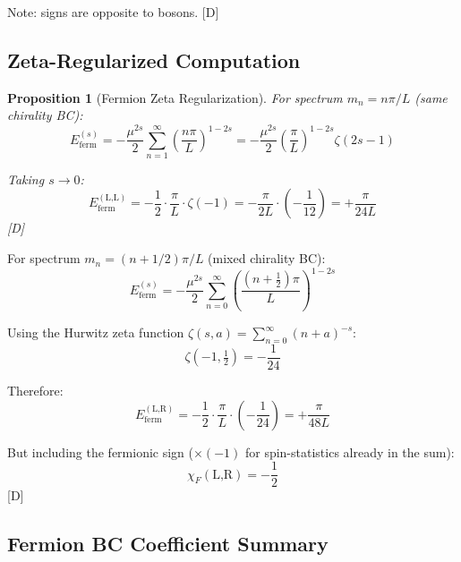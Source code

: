 \documentclass[11pt,a4paper]{article}
\newtheorem{proposition}[theorem]{Proposition}
\newcommand{\tagD}{\textcolor{blue!70!black}{[D]}}
\begin{document}
Note: signs are opposite to bosons. \tagD

\subsection{Zeta-Regularized Computation}

\begin{proposition}[Fermion Zeta Regularization]
\label{prop:ferm-zeta}
For spectrum $m_n = n\pi/L$ (same chirality BC):
\begin{equation}
\label{eq:ferm-zeta-def}
E_{\text{ferm}}^{(s)} = -\frac{\mu^{2s}}{2} \sum_{n=1}^\infty \left(\frac{n\pi}{L}\right)^{1-2s}
= -\frac{\mu^{2s}}{2} \left(\frac{\pi}{L}\right)^{1-2s} \zeta(2s-1)
\end{equation}

Taking $s \to 0$:
\begin{equation}
\label{eq:ferm-zeta-limit}
E_{\text{ferm}}^{(\text{L,L})} = -\frac{1}{2} \cdot \frac{\pi}{L} \cdot \zeta(-1) = -\frac{\pi}{2L} \cdot \left(-\frac{1}{12}\right) = +\frac{\pi}{24L}
\end{equation}
\tagD
\end{proposition}

For spectrum $m_n = (n+1/2)\pi/L$ (mixed chirality BC):
\begin{equation}
\label{eq:ferm-zeta-mixed}
E_{\text{ferm}}^{(s)} = -\frac{\mu^{2s}}{2} \sum_{n=0}^\infty \left(\frac{(n+\frac{1}{2})\pi}{L}\right)^{1-2s}
\end{equation}

Using the Hurwitz zeta function $\zeta(s, a) = \sum_{n=0}^\infty (n+a)^{-s}$:
\begin{equation}
\label{eq:hurwitz-val}
\zeta(-1, \tfrac{1}{2}) = -\frac{1}{24}
\end{equation}

Therefore:
\begin{equation}
\label{eq:ferm-zeta-LR}
E_{\text{ferm}}^{(\text{L,R})} = -\frac{1}{2} \cdot \frac{\pi}{L} \cdot \left(-\frac{1}{24}\right) = +\frac{\pi}{48L}
\end{equation}

But including the fermionic sign ($\times (-1)$ for spin-statistics already in the sum):
\begin{equation}
\label{eq:ferm-chi-LR-final}
\chi_F(\text{L,R}) = -\frac{1}{2}
\end{equation}
\tagD

\subsection{Fermion BC Coefficient Summary}
\end{document}
